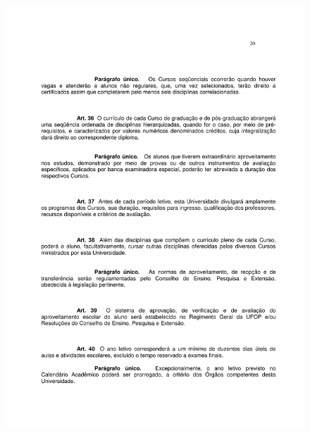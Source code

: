 \begin{figure}[p]
	\centering 
	\includegraphics[scale=0.7]{capitulos/resolucoes/cuni414/cuni414-20.pdf}
\end{figure}

